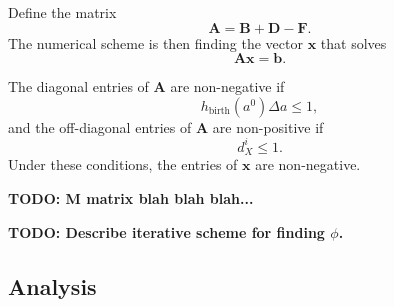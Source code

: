 \documentclass[12pt]{article}
\renewcommand{\vec}[1]{\mathbf{#1}}
\newcommand{\mat}[1]{\mathbf{#1}}
\begin{document}
Define the matrix
\begin{equation}
  \mat{A} =
  \mat{B} + \mat{D} - \mat{F}.
\end{equation}
The numerical scheme is then finding the vector $\vec{x}$ that solves
\begin{equation}
  \mat{A} \vec{x} = \vec{b}.
\end{equation}

The diagonal entries of $\mat{A}$ are non-negative if
\begin{equation}
  h_{\text{birth}}(a^0) \Delta a \leq 1,
\end{equation}
and the off-diagonal entries of $\mat{A}$ are non-positive if
\begin{equation}
  d_X^i \leq 1.
\end{equation}
Under these conditions, the entries of $\vec{x}$ are non-negative.

\textbf{TODO: M matrix blah blah blah...}

\textbf{TODO: Describe iterative scheme for finding $\phi$.}

\subsection{Analysis}
\end{document}
